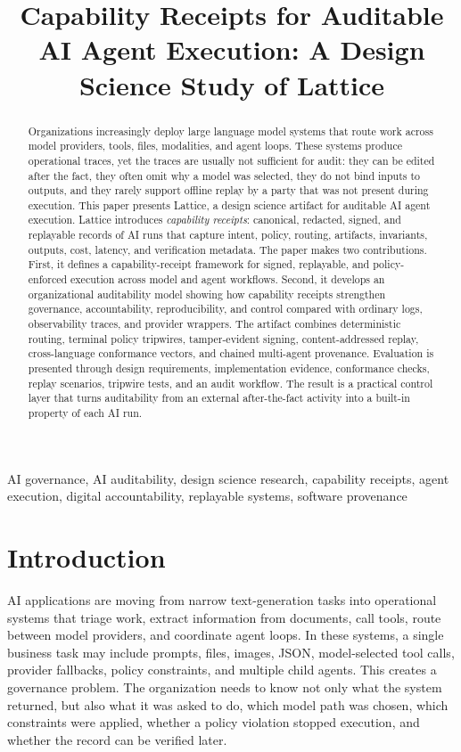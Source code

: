 \documentclass[conference]{IEEEtran}
\title{Capability Receipts for Auditable AI Agent Execution: A Design Science Study of Lattice}
\author{\IEEEauthorblockN{Lakshman Turlapati}
\IEEEauthorblockA{Independent Researcher\\
Email: lakshmanturlapati@gmail.com}}
\begin{document}
\maketitle

\begin{abstract}
Organizations increasingly deploy large language model systems that route work
across model providers, tools, files, modalities, and agent loops. These systems
produce operational traces, yet the traces are usually not sufficient for audit:
they can be edited after the fact, they often omit why a model was selected, they
do not bind inputs to outputs, and they rarely support offline replay by a party
that was not present during execution. This paper presents Lattice, a design
science artifact for auditable AI agent execution. Lattice introduces
\emph{capability receipts}: canonical, redacted, signed, and replayable records
of AI runs that capture intent, policy, routing, artifacts, invariants, outputs,
cost, latency, and verification metadata. The paper makes two contributions.
First, it defines a capability-receipt framework for signed, replayable, and
policy-enforced execution across model and agent workflows. Second, it develops
an organizational auditability model showing how capability receipts strengthen
governance, accountability, reproducibility, and control compared with ordinary
logs, observability traces, and provider wrappers. The artifact combines
deterministic routing, terminal policy tripwires, tamper-evident signing,
content-addressed replay, cross-language conformance vectors, and chained
multi-agent provenance. Evaluation is presented through design requirements,
implementation evidence, conformance checks, replay scenarios, tripwire tests,
and an audit workflow. The result is a practical control layer that turns
auditability from an external after-the-fact activity into a built-in property
of each AI run.
\end{abstract}

\begin{IEEEkeywords}
AI governance, AI auditability, design science research, capability receipts,
agent execution, digital accountability, replayable systems, software provenance
\end{IEEEkeywords}

\section{Introduction}

AI applications are moving from narrow text-generation tasks into operational
systems that triage work, extract information from documents, call tools, route
between model providers, and coordinate agent loops. In these systems, a single
business task may include prompts, files, images, JSON, model-selected tool
calls, provider fallbacks, policy constraints, and multiple child agents. This
creates a governance problem. The organization needs to know not only what the
system returned, but also what it was asked to do, which model path was chosen,
which constraints were applied, whether a policy violation stopped execution,
and whether the record can be verified later.
\end{document}
